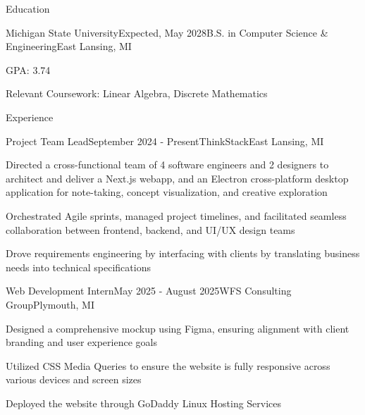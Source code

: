 \documentclass[
	11pt
]{resume}
\begin{document}
	\begin{rSection}{E}{ducation}
		\begin{rSectionEntry}{Michigan State University}{Expected, May 2028}{B.S. in Computer Science \& Engineering}{East Lansing, MI}
			\item GPA: 3.74
			\item Relevant Coursework: Linear Algebra, Discrete Mathematics
		\end{rSectionEntry}
	\end{rSection}

	\begin{rSection}{E}{xperience}
		\begin{rSectionEntry}{Project Team Lead}{September 2024 - Present}{ThinkStack}{East Lansing, MI}
			\item Directed a cross-functional team of 4 software engineers and 2 designers to architect and deliver a Next.js webapp, and an Electron cross-platform desktop application for note-taking, concept visualization, and creative exploration
			\item Orchestrated Agile sprints, managed project timelines, and facilitated seamless collaboration between frontend, backend, and UI/UX design teams
			\item Drove requirements engineering by interfacing with clients by translating business needs into technical specifications
		\end{rSectionEntry}

		\begin{rSectionEntry}{Web Development Intern}{May 2025 - August 2025}{WFS Consulting Group}{Plymouth, MI}
			\item Designed a comprehensive mockup using Figma, ensuring alignment with client branding and user experience goals
			\item Utilized CSS Media Queries to ensure the website is fully responsive across various devices and screen sizes
			\item Deployed the website through GoDaddy Linux Hosting Services
		\end{rSectionEntry}
	\end{rSection}
\end{document}
